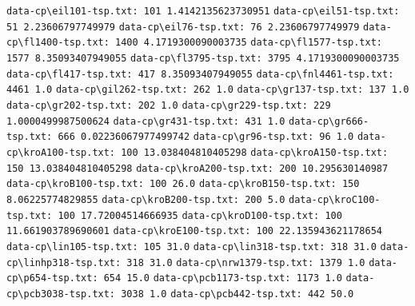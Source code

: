 \documentclass{tufte-handout}
\begin{document}
\verb+data-cp\eil101-tsp.txt: 101 1.4142135623730951+\newline
\verb+data-cp\eil51-tsp.txt: 51 2.23606797749979+\newline
\verb+data-cp\eil76-tsp.txt: 76 2.23606797749979+\newline
\verb+data-cp\fl1400-tsp.txt: 1400 4.1719300090003735+\newline
\verb+data-cp\fl1577-tsp.txt: 1577 8.35093407949055+\newline
\verb+data-cp\fl3795-tsp.txt: 3795 4.1719300090003735+\newline
\verb+data-cp\fl417-tsp.txt: 417 8.35093407949055+\newline
\verb+data-cp\fnl4461-tsp.txt: 4461 1.0+\newline
\verb+data-cp\gil262-tsp.txt: 262 1.0+\newline
\verb+data-cp\gr137-tsp.txt: 137 1.0+\newline
\verb+data-cp\gr202-tsp.txt: 202 1.0+\newline
\verb+data-cp\gr229-tsp.txt: 229 1.0000499987500624+\newline
\verb+data-cp\gr431-tsp.txt: 431 1.0+\newline
\verb+data-cp\gr666-tsp.txt: 666 0.02236067977499742+\newline
\verb+data-cp\gr96-tsp.txt: 96 1.0+\newline
\verb+data-cp\kroA100-tsp.txt: 100 13.038404810405298+\newline
\verb+data-cp\kroA150-tsp.txt: 150 13.038404810405298+\newline
\verb+data-cp\kroA200-tsp.txt: 200 10.295630140987+\newline
\verb+data-cp\kroB100-tsp.txt: 100 26.0+\newline
\verb+data-cp\kroB150-tsp.txt: 150 8.06225774829855+\newline
\verb+data-cp\kroB200-tsp.txt: 200 5.0+\newline
\verb+data-cp\kroC100-tsp.txt: 100 17.72004514666935+\newline
\verb+data-cp\kroD100-tsp.txt: 100 11.661903789690601+\newline
\verb+data-cp\kroE100-tsp.txt: 100 22.135943621178654+\newline
\verb+data-cp\lin105-tsp.txt: 105 31.0+\newline
\verb+data-cp\lin318-tsp.txt: 318 31.0+\newline
\verb+data-cp\linhp318-tsp.txt: 318 31.0+\newline
\verb+data-cp\nrw1379-tsp.txt: 1379 1.0+\newline
\verb+data-cp\p654-tsp.txt: 654 15.0+\newline
\verb+data-cp\pcb1173-tsp.txt: 1173 1.0+\newline
\verb+data-cp\pcb3038-tsp.txt: 3038 1.0+\newline
\verb+data-cp\pcb442-tsp.txt: 442 50.0+\newline
\end{document}
